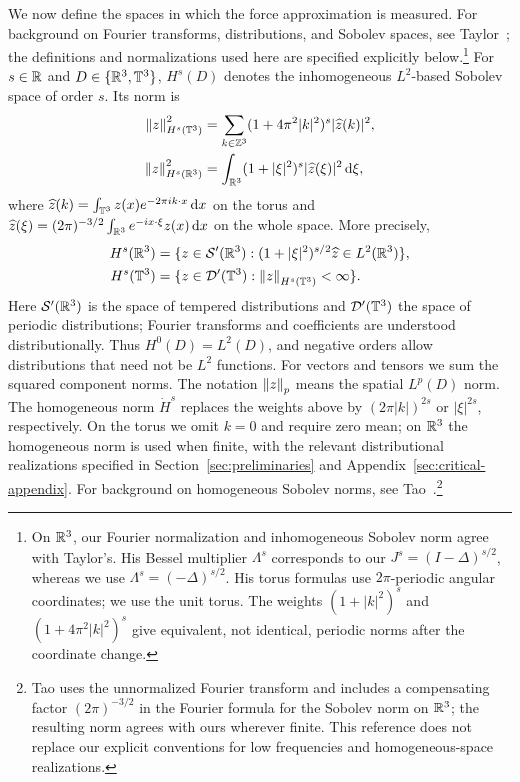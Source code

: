 We now define the spaces in which the force approximation is measured.
For background on Fourier transforms, distributions, and Sobolev spaces,
see Taylor~\cite[Chapter~3, Sections~3--4, and Chapter~4, Sections~1 and~3]{taylor2011};
the definitions and normalizations used here are specified explicitly
below.\footnote{On $\mathbb R^3$, our Fourier normalization and inhomogeneous
Sobolev norm agree with Taylor's. His Bessel multiplier $\Lambda^s$
corresponds to our $J^s=(I-\Delta)^{s/2}$, whereas we use
$\Lambda^s=(-\Delta)^{s/2}$. His torus formulas use $2\pi$-periodic
angular coordinates; we use the unit torus. The weights
$(1+|k|^2)^s$ and $(1+4\pi^2|k|^2)^s$ give equivalent, not identical,
periodic norms after the coordinate change.}
For $s\in\mathbb R$ and $D\in\{\mathbb R^3,\mathbb T^3\}$, $H^s(D)$ denotes the
inhomogeneous $L^2$-based Sobolev space of order $s$. Its norm is
\begin{align*}
 \left\lVert z\right\rVert_{H^s(\mathbb T^3)}^2
 &=\sum_{k\in\mathbb Z^3}(1+4\pi^2|k|^2)^s|\widehat z(k)|^2,\\
 \left\lVert z\right\rVert_{H^s(\mathbb R^3)}^2
 &=\int_{\mathbb R^3}(1+|\xi|^2)^s|\widehat z(\xi)|^2\,\mathrm d\xi,
\end{align*}
where
$\widehat z(k)=\int_{\mathbb T^3}z(x)e^{-2\pi i k\cdot x}\,\mathrm d x$ on the torus
and
$\widehat z(\xi)=(2\pi)^{-3/2}\int_{\mathbb R^3}e^{-ix\cdot\xi}z(x)\,\mathrm d x$
on the whole space. More precisely,
\begin{align*}
 H^s(\mathbb R^3)&=\{z\in\mathcal S'(\mathbb R^3):
        (1+|\xi|^2)^{s/2}\widehat z\in L^2(\mathbb R^3)\},\\
 H^s(\mathbb T^3)&=\{z\in\mathcal D'(\mathbb T^3):
        \left\lVert z\right\rVert_{H^s(\mathbb T^3)}<\infty\}.
\end{align*}
Here $\mathcal S'(\mathbb R^3)$ is the space of tempered distributions and
$\mathcal D'(\mathbb T^3)$ the space of periodic distributions; Fourier transforms
and coefficients are understood distributionally. Thus $H^0(D)=L^2(D)$,
and negative orders allow distributions that need not be $L^2$ functions.
For vectors and tensors we sum the squared component norms.
The notation $\left\lVert z\right\rVert_p$ means the spatial $L^p(D)$
norm. The homogeneous norm $\dot H^s$ replaces the weights above by
$(2\pi|k|)^{2s}$ or $|\xi|^{2s}$, respectively. On the torus we omit
$k=0$ and require zero mean; on $\mathbb R^3$ the homogeneous norm is used
when finite, with the relevant distributional realizations specified
in Section~\ref{sec:preliminaries} and Appendix~\ref{sec:critical-appendix}.
For background on homogeneous Sobolev norms, see
Tao~\cite[Appendix~A]{taodispersive}.\footnote{Tao uses the unnormalized
Fourier transform and includes a compensating factor $(2\pi)^{-3/2}$
in the Fourier formula for the Sobolev norm on $\mathbb R^3$; the resulting
norm agrees with ours wherever finite. This reference does not replace
our explicit conventions for low frequencies and homogeneous-space
realizations.}

